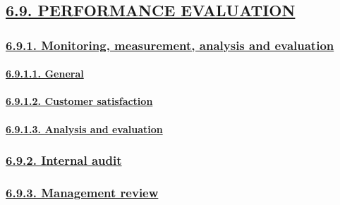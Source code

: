 \documentclass[
]{article}
\begin{document}
\hypertarget{performance-evaluation}{%
\subsection{\texorpdfstring{\protect\hyperlink{performance-evaluation-1}{6.9.
PERFORMANCE
EVALUATION}}{6.9. PERFORMANCE EVALUATION}}\label{performance-evaluation}}

\hypertarget{monitoring-measurement-analysis-and-evaluation}{%
\subsubsection{\texorpdfstring{\protect\hyperlink{monitoring-measurement-analysis-and-evaluation-1}{6.9.1.
Monitoring, measurement, analysis and
evaluation}}{6.9.1. Monitoring, measurement, analysis and evaluation}}\label{monitoring-measurement-analysis-and-evaluation}}

\hypertarget{general-6}{%
\paragraph{\texorpdfstring{\protect\hyperlink{general-15}{6.9.1.1.
General}}{6.9.1.1. General}}\label{general-6}}

\hypertarget{customer-satisfaction}{%
\paragraph{\texorpdfstring{\protect\hyperlink{customer-satisfaction-1}{6.9.1.2.
Customer
satisfaction}}{6.9.1.2. Customer satisfaction}}\label{customer-satisfaction}}

\hypertarget{analysis-and-evaluation}{%
\paragraph{\texorpdfstring{\protect\hyperlink{analysis-and-evaluation-1}{6.9.1.3.
Analysis and
evaluation}}{6.9.1.3. Analysis and evaluation}}\label{analysis-and-evaluation}}

\hypertarget{internal-audit}{%
\subsubsection{\texorpdfstring{\protect\hyperlink{internal-audit-1}{6.9.2.
Internal audit}}{6.9.2. Internal audit}}\label{internal-audit}}

\hypertarget{management-review}{%
\subsubsection{\texorpdfstring{\protect\hyperlink{management-review-1}{6.9.3.
Management review}}{6.9.3. Management review}}\label{management-review}}
\end{document}
